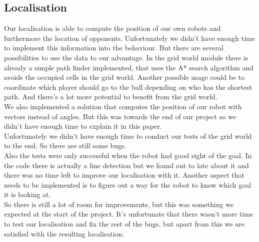 \documentclass[lnicst,a4paper]{svmultln}
\begin{document}
\subsection{Localisation}
\label{sec:results_localisation}
Our localisation is able to compute the position of our own robots and furthermore the location of opponents. Unfortunately we didn't have enough time to implement this information into the behaviour. But there are several possibilities to use the data to our advantage. In the grid world module there is already a simple path finder implemented, that uses the A* search algorithm and avoids the occupied cells in the grid world. Another possible usage could be to coordinate which player should go to the ball depending on who has the shortest path. And there's a lot more potential to benefit from the grid world.
\\
We also implemented a solution that computes the position of our robot with vectors instead of angles. But this was towards the end of our project so we didn't have enough time to explain it in this paper.
\\
Unfortunately we didn't have enough time to conduct our tests of the grid world to the end. So there are still some bugs. 
\\
Also the tests were only successful when the robot had good sight of the goal. In the code there is actually a line detection but we found out to late about it and there was no time left to improve our localisation with it. Another aspect that needs to be implemented is to figure out a way for the robot to know which goal it is looking at.
\\
So there is still a lot of room for improvements, but this was something we expected at the start of the project. It's unfortunate that there wasn't more time to test our localisation and fix the rest of the bugs, but apart from this we are satisfied with the resulting localisation.
\end{document}

